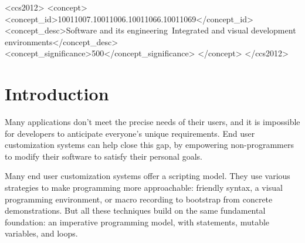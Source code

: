 \documentclass[sigplan,screen,10pt,anonymous,review]{acmart}
\begin{document}
\begin{CCSXML}
<ccs2012>
<concept>
<concept_id>10011007.10011006.10011066.10011069</concept_id>
<concept_desc>Software and its engineering~Integrated and visual development environments</concept_desc>
<concept_significance>500</concept_significance>
</concept>
</ccs2012>
\end{CCSXML}




\maketitle

\hypertarget{introduction}{%
\section{Introduction}\label{introduction}}

Many applications don't meet the precise needs of their users, and it is
impossible for developers to anticipate everyone's unique requirements.
End user customization systems can help close this gap, by empowering
non-programmers to modify their software to satisfy their personal
goals.

Many end user customization systems
\citep{cook2007, bolin2005, leshed2008, chasins2018} offer a scripting
model. They use various strategies to make programming more
approachable: friendly syntax, a visual programming environment, or
macro recording to bootstrap from concrete demonstrations. But all these
techniques build on the same fundamental foundation: an imperative
programming model, with statements, mutable variables, and loops.
\end{document}
